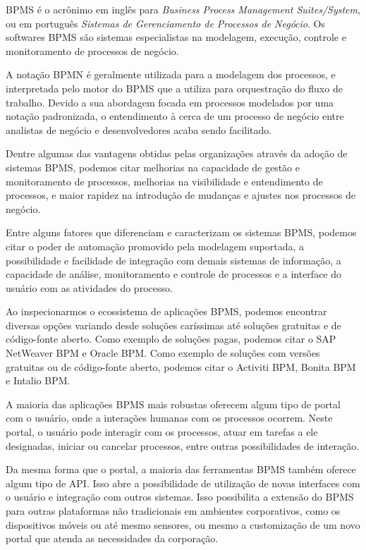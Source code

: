 BPMS\cite{bpms} é o acrônimo em inglês para \textit{Business Process Management Suites/System}, ou em português \textit{Sistemas de Gerenciamento de Processos de Negócio}. Os softwares BPMS são sistemas especialistas na modelagem, execução, controle e monitoramento de processos de negócio. 

A notação BPMN é geralmente utilizada para a modelagem dos processos, e interpretada pelo motor do BPMS que a utiliza para orquestração do fluxo de trabalho. Devido a sua abordagem focada em processos modelados por uma notação padronizada, o entendimento à cerca de um processo de negócio entre analistas de negócio e desenvolvedores acaba sendo facilitado. 

Dentre algumas das vantagens obtidas pelas organizações através da adoção de sistemas BPMS, podemos citar melhorias na capacidade de gestão e monitoramento de processos, melhorias na visibilidade e entendimento de processos, e maior rapidez na introdução de mudanças e ajustes nos processos de negócio.

Entre alguns fatores que diferenciam e caracterizam os sistemas BPMS, podemos citar o poder de automação promovido pela modelagem suportada, a possibilidade e facilidade de integração com demais sistemas de informação, a capacidade de análise, monitoramento e controle de processos e a interface do usuário com as atividades do processo.

Ao inspecionarmos o ecossistema de aplicações BPMS, podemos encontrar diversas opções variando desde soluções caríssimas até soluções gratuitas e de código-fonte aberto. Como exemplo de soluções pagas, podemos citar o SAP NetWeaver BPM\cite{bpm_sap} e Oracle BPM\cite{bpm_oracle}. Como exemplo de soluções com versões gratuitas ou de código-fonte aberto, podemos citar o Activiti BPM\cite{bpm_activiti}, Bonita BPM\cite{bpm_bonita} e Intalio BPM\cite{bpm_intalio}.

A maioria das aplicações BPMS mais robustas oferecem algum tipo de portal com o usuário, onde a interações humanas com os processos ocorrem. Neste portal, o usuário pode interagir com os processos, atuar em tarefas a ele designadas, iniciar ou cancelar processos, entre outras possibilidades de interação.

Da mesma forma que o portal, a maioria das ferramentas BPMS também oferece algum tipo de API. Isso abre a possibilidade de utilização de novas interfaces com o usuário e integração com outros sistemas. Isso possibilita a extensão do BPMS para outras plataformas não tradicionais em ambientes corporativos, como os dispositivos móveis ou até mesmo sensores, ou mesmo a customização de um novo portal que atenda as necessidades da corporação.


